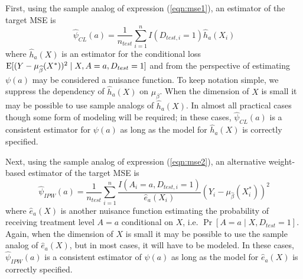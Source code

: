 First, using the sample analog of expression (\ref{eqn:mse1}), an estimator of the target MSE is 
\begin{equation}\label{eqn:cl_estimator}
    \widehat{\psi}_{CL}(a) = \frac{1}{n_{test}} \sum_{i=1}^nI(D_{test, i} = 1)\widehat{h}_a(X_i)
\end{equation}
where $\widehat{h}_a(X)$ is an estimator for the conditional loss $\operatorname{E}[(Y - \mu_{\widehat{\beta}}(X^*))^2 \mid X, A=a, D_{test} = 1]$ and from the perspective of estimating $\psi(a)$ may be considered a nuisance function. To keep notation simple, we suppress the dependency of $\widehat{h}_a(X)$ on $\mu_{\widehat{\beta}}$. When the dimension of $X$ is small it may be possible to use sample analogs of $\widehat{h}_a(X)$. In almost all practical cases though some form of modeling will be required; in these cases, $\widehat{\psi}_{CL}(a)$ is a consistent estimator for $\psi(a)$ as long as the model for $\widehat{h}_a(X)$ is correctly specified.

Next, using the sample analog of expression (\ref{eqn:mse2}), an alternative weight-based estimator of the target MSE is 
\begin{equation}\label{eqn:ipw_estimator}
    \widehat{\psi}_{IPW}(a) = \frac{1}{n_{test}} \sum_{i=1}^n \frac{I(A_i = a, D_{test, i} = 1)}{\widehat{e}_a(X_i)}(Y_i - \mu_{\widehat{\beta}}(X^*_i))^2
\end{equation}
where $\widehat{e}_a(X)$ is another nuisance function estimating the probability of receiving treatment level $A = a$ conditional on $X$, i.e. $\Pr[A = a \mid X, D_{test} = 1]$. Again, when the dimension of $X$ is small it may be possible to use the sample analog of $\widehat{e}_a(X)$, but in most cases, it will have to be modeled. In these cases, $\widehat{\psi}_{IPW}(a)$ is a consistent estimator of $\psi(a)$ as long as the model for $\widehat{e}_a(X)$ is correctly specified.

